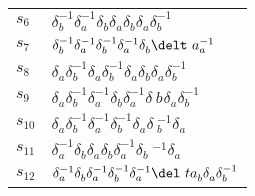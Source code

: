 \documentclass{article}
\begin{document}
\begin{center}
\begin{tabular}{ll}
$s_{6}$ & $\delta_b^{-1}\delta_a^{-1}\delta_b^{}\delta_a^{}\delta_b^{}\delta_a^\
{}\delta_b^{-1}$ \\
$s_{7}$ & $\delta_b^{-1}\delta_a^{-1}\delta_b^{-1}\delta_a^{-1}\delta_b^{}\delt\
a_a^{-1}$ \\
$s_{8}$ & $\delta_a^{}\delta_b^{-1}\delta_a^{}\delta_b^{-1}\delta_a^{}\delta_b^\
{}\delta_a^{}\delta_b^{-1}$ \\
$s_{9}$ & $\delta_a^{}\delta_b^{-1}\delta_a^{-1}\delta_b^{}\delta_a^{-1}\delta_\
b^{}\delta_a^{}\delta_b^{-1}$ \\
$s_{10}$ & $\delta_a^{}\delta_b^{-1}\delta_a^{-1}\delta_b^{-1}\delta_a^{}\delta\
_b^{-1}\delta_a^{}$ \\
$s_{11}$ & $\delta_a^{-1}\delta_b^{}\delta_a^{}\delta_b^{}\delta_a^{-1}\delta_b\
^{-1}\delta_a^{}$ \\
$s_{12}$ & $\delta_a^{-1}\delta_b^{}\delta_a^{-1}\delta_b^{-1}\delta_a^{-1}\del\
ta_b^{}\delta_a^{}\delta_b^{-1}$ \\
\bottomrule
\end{tabular}
\end{center}

\thispagestyle{empty}
\end{document}
